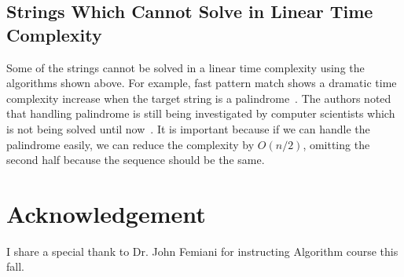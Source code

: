 \documentclass{acm_proc_article-sp}
\begin{document}
\subsection{Strings Which Cannot Solve in Linear Time Complexity}
\begin{flushleft}
Some of the strings cannot be solved in a linear time complexity using the algorithms shown above. For example, fast pattern match shows a dramatic time complexity increase when the target string is a palindrome~\cite{Fast}. The authors noted that handling palindrome is still being investigated by computer scientists which is not being solved until now~\cite{Fast}. It is important because if we can handle the palindrome easily, we can reduce the complexity by $O(n/2)$, omitting the second half because the sequence should be the same.
\end{flushleft}

\section{Acknowledgement}
\begin{flushleft}
I share a special thank to Dr. John Femiani for instructing Algorithm course this fall.
\end{flushleft}




\end{document}
